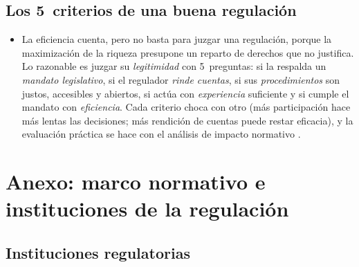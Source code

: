 \documentclass[11pt]{article}
\begin{document}
\subsection{Los 5~criterios de una buena regulación}\label{anexo:buena-regulacion}

\begin{itemize}
\item La eficiencia cuenta, pero no basta para juzgar una regulación, porque la maximización de la riqueza presupone un reparto de derechos que no justifica\nocite{BaldwinCaveLodge2012Understanding}. Lo razonable es juzgar su \emph{legitimidad} con 5~preguntas: si la respalda un \emph{mandato legislativo}, si el regulador \emph{rinde cuentas}, si sus \emph{procedimientos} son justos, accesibles y abiertos, si actúa con \emph{experiencia} suficiente y si cumple el mandato con \emph{eficiencia}. Cada criterio choca con otro (más participación hace más lentas las decisiones; más rendición de cuentas puede restar eficacia), y la evaluación práctica se hace con el análisis de impacto normativo .
\end{itemize}

\section{Anexo: marco normativo e instituciones de la regulación}\label{anexo:marco-normativo}

\subsection{Instituciones regulatorias}\label{anexo:instituciones}
\end{document}

